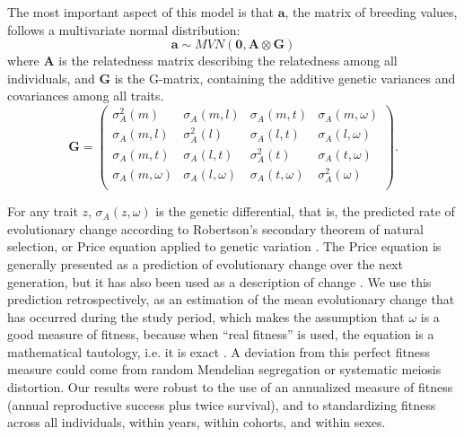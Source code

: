 The most important aspect of this model is that $\boldsymbol{a}$, the matrix of breeding values, follows a multivariate normal distribution:
\begin{equation}\boldsymbol{a}
\sim MVN\left(\boldsymbol{0},
\boldsymbol{A \otimes G}
\right)
\end{equation}
where $\boldsymbol{A}$ is the relatedness matrix describing the relatedness among all individuals, and $\boldsymbol{G}$ is the G-matrix, containing the additive genetic variances and covariances among all traits.\\

\begin{equation}
\boldsymbol{G}=\begin{pmatrix}
\sigma_{A}^2(m) & \sigma_{A}(m,l) & \sigma_{A}(m,t) & \sigma_{A}(m,\omega)\\
\sigma_{A}(m,l) & \sigma_{A}^2(l) & \sigma_{A}(l,t) & \sigma_{A}(l,\omega)\\
\sigma_{A}(m,t) & \sigma_{A}(l,t) & \sigma_{A}^2(t) & \sigma_{A}(t,\omega)\\
\sigma_{A}(m,\omega) & \sigma_{A}(l,\omega) & \sigma_{A}(t,\omega) & \sigma_{A}^2(\omega)\\
\end{pmatrix}.
\end{equation}

For any trait $z$, $\sigma_{A}(z,\omega)$ is the genetic differential, that is, the predicted rate of evolutionary change according to Robertson's secondary theorem of natural selection, or Price equation applied to genetic variation \parencite{Robertson1966, Price1970, Morrissey2012sts}. The Price equation is generally presented as a prediction of evolutionary change over the next generation, but it has also been used as a description of change \parencite{Heywood2005, Frank2012IV, Coulson2008}. We use this prediction retrospectively, as an estimation of the mean evolutionary change that has occurred during the study period, which makes the assumption that $\omega$ is a good measure of fitness, because when ``real fitness'' is used, the equation is a mathematical tautology, i.e. it is exact \parencite{Frank2012IV}. A deviation from this perfect fitness measure could come from random Mendelian segregation or systematic meiosis distortion. Our results were robust to the use of an annualized measure of fitness (annual reproductive success plus twice survival), and to standardizing fitness across all individuals, within years, within cohorts, and within sexes.

